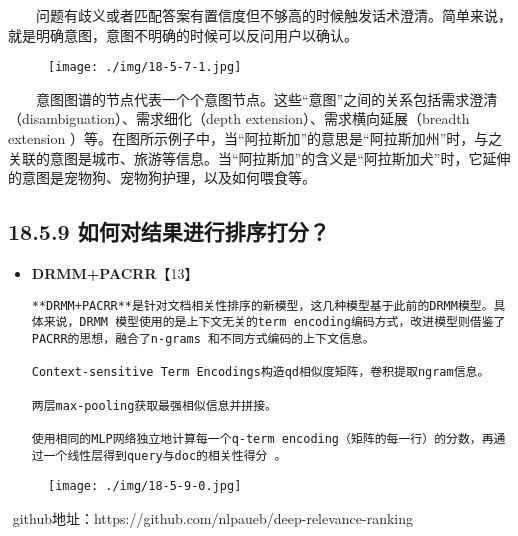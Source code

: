   问题有歧义或者匹配答案有置信度但不够高的时候触发话术澄清。简单来说，就是明确意图，意图不明确的时候可以反问用户以确认。

\begin{figure}
\centering
\texttt{[image: ./img/18-5-7-1.jpg]}
\caption{}
\end{figure}

  意图图谱的节点代表一个个意图节点。这些``意图''之间的关系包括需求澄清（disambiguation）、需求细化（depth
extension）、需求横向延展（breadth extension
）等。在图所示例子中，当``阿拉斯加''的意思是``阿拉斯加州''时，与之关联的意图是城市、旅游等信息。当``阿拉斯加''的含义是``阿拉斯加犬''时，它延伸的意图是宠物狗、宠物狗护理，以及如何喂食等。

\subsection{18.5.9
如何对结果进行排序打分？}\label{ux5982ux4f55ux5bf9ux7ed3ux679cux8fdbux884cux6392ux5e8fux6253ux5206}

\begin{itemize}
\item
  \textbf{DRMM+PACRR}【13】

\begin{verbatim}
**DRMM+PACRR**是针对文档相关性排序的新模型，这几种模型基于此前的DRMM模型。具体来说，DRMM 模型使用的是上下文无关的term encoding编码方式，改进模型则借鉴了PACRR的思想，融合了n-grams 和不同方式编码的上下文信息。

Context-sensitive Term Encodings构造qd相似度矩阵，卷积提取ngram信息。

两层max-pooling获取最强相似信息并拼接。

使用相同的MLP网络独立地计算每一个q-term encoding（矩阵的每一行）的分数，再通过一个线性层得到query与doc的相关性得分 。
\end{verbatim}
\end{itemize}

\begin{figure}
\centering
\texttt{[image: ./img/18-5-9-0.jpg]}
\caption{}
\end{figure}

​ github地址：https://github.com/nlpaueb/deep-relevance-ranking

